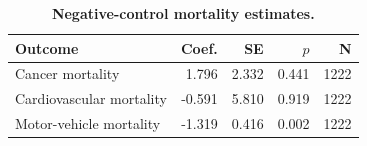 \begin{table}[H]
\centering
\caption{\textbf{Negative-control mortality estimates.}}
\label{tab:negative_controls}
\begin{tabular}{lrrrr}
\toprule
Outcome & Coef. & SE & $p$ & N \\
\midrule
Cancer mortality & 1.796 & 2.332 & 0.441 & 1222 \\
Cardiovascular mortality & -0.591 & 5.810 & 0.919 & 1222 \\
Motor-vehicle mortality & -1.319 & 0.416 & 0.002 & 1222 \\
\bottomrule
\end{tabular}
\end{table}

